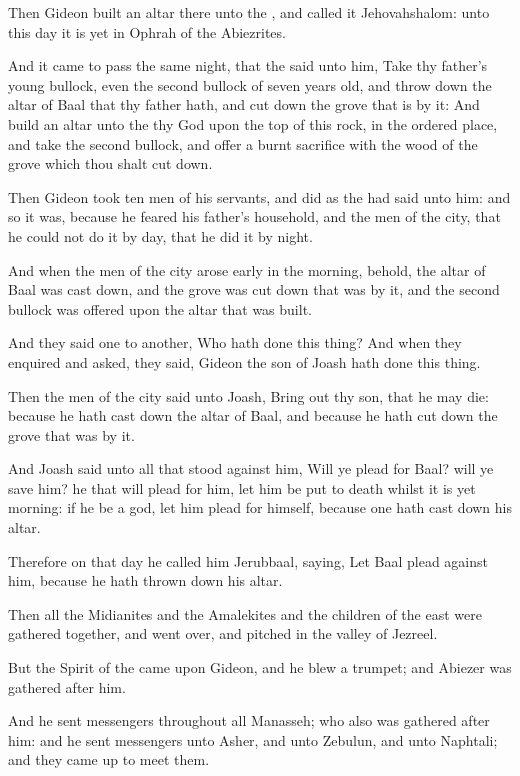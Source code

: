 \Verse Then Gideon built an altar there unto the \LORD, and called it Jehovahshalom: unto this day it is yet in Ophrah of the Abiezrites.

\Verse And it came to pass the same night, that the \LORD said unto him, Take thy father's young bullock, even the second bullock of seven years old, and throw down the altar of Baal that thy father hath, and cut down the grove that is by it: \Verse And build an altar unto the \LORD thy God upon the top of this rock, in the ordered place, and take the second bullock, and offer a burnt sacrifice with the wood of the grove which thou shalt cut down.

\Verse Then Gideon took ten men of his servants, and did as the \LORD had said unto him: and so it was, because he feared his father's household, and the men of the city, that he could not do it by day, that he did it by night.

\Verse And when the men of the city arose early in the morning, behold, the altar of Baal was cast down, and the grove was cut down that was by it, and the second bullock was offered upon the altar that was built.

\Verse And they said one to another, Who hath done this thing? And when they enquired and asked, they said, Gideon the son of Joash hath done this thing.

\Verse Then the men of the city said unto Joash, Bring out thy son, that he may die: because he hath cast down the altar of Baal, and because he hath cut down the grove that was by it.

\Verse And Joash said unto all that stood against him, Will ye plead for Baal? will ye save him? he that will plead for him, let him be put to death whilst it is yet morning: if he be a god, let him plead for himself, because one hath cast down his altar.

\Verse Therefore on that day he called him Jerubbaal, saying, Let Baal plead against him, because he hath thrown down his altar.

\Verse Then all the Midianites and the Amalekites and the children of the east were gathered together, and went over, and pitched in the valley of Jezreel.

\Verse But the Spirit of the \LORD came upon Gideon, and he blew a trumpet; and Abiezer was gathered after him.

\Verse And he sent messengers throughout all Manasseh; who also was gathered after him: and he sent messengers unto Asher, and unto Zebulun, and unto Naphtali; and they came up to meet them.

